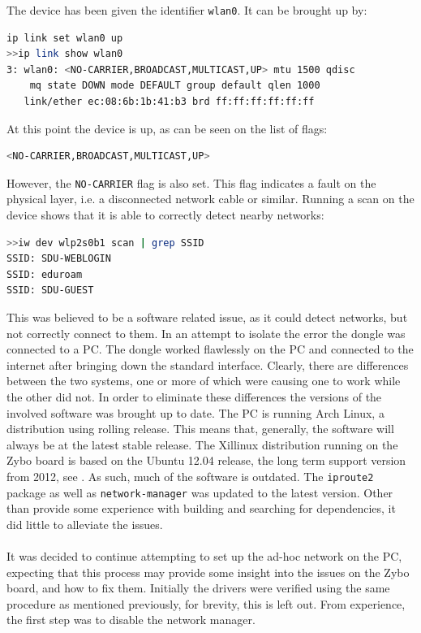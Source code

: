 The device has been given the identifier \texttt{wlan0}.
It can be brought up by:
\begin{lstlisting}[language=bash]
ip link set wlan0 up
>>ip link show wlan0
3: wlan0: <NO-CARRIER,BROADCAST,MULTICAST,UP> mtu 1500 qdisc 
	mq state DOWN mode DEFAULT group default qlen 1000
   link/ether ec:08:6b:1b:41:b3 brd ff:ff:ff:ff:ff:ff
\end{lstlisting}
At this point the device is up, as can be seen on the list of flags:
\begin{lstlisting}[language=bash]
<NO-CARRIER,BROADCAST,MULTICAST,UP>
\end{lstlisting}
However, the \texttt{NO-CARRIER} flag is also set.
This flag indicates a fault on the physical layer, i.e. a disconnected network cable or similar.
Running a scan on the device shows that it is able to correctly detect nearby networks:
\begin{lstlisting}[language=bash]
>>iw dev wlp2s0b1 scan | grep SSID
SSID: SDU-WEBLOGIN
SSID: eduroam
SSID: SDU-GUEST
\end{lstlisting}
This was believed to be a software related issue, as it could detect networks, but not correctly connect to them.
In an attempt to isolate the error the dongle was connected to a PC.
The dongle worked flawlessly on the PC and connected to the internet after bringing down the standard interface.
Clearly, there are differences between the two systems, one or more of which were causing one to work while the other did not.
In order to eliminate these differences the versions of the involved software was brought up to date.
The PC is running Arch Linux, a distribution using rolling release.
This means that, generally, the software will always be at the latest stable release.
The Xillinux distribution running on the Zybo board is based on the Ubuntu 12.04 release, the long term support version from 2012, see \cite{xillinux}.
As such, much of the software is outdated.
The \texttt{iproute2} package as well as \texttt{network-manager} was updated to the latest version.
Other than provide some experience with building and searching for dependencies, it did little to alleviate the issues.
\\~\\
It was decided to continue attempting to set up the ad-hoc network on the PC, expecting that this process may provide some insight into the issues on the Zybo board, and how to fix them.
Initially the drivers were verified using the same procedure as mentioned previously, for brevity, this is left out.
From experience, the first step was to disable the network manager.
